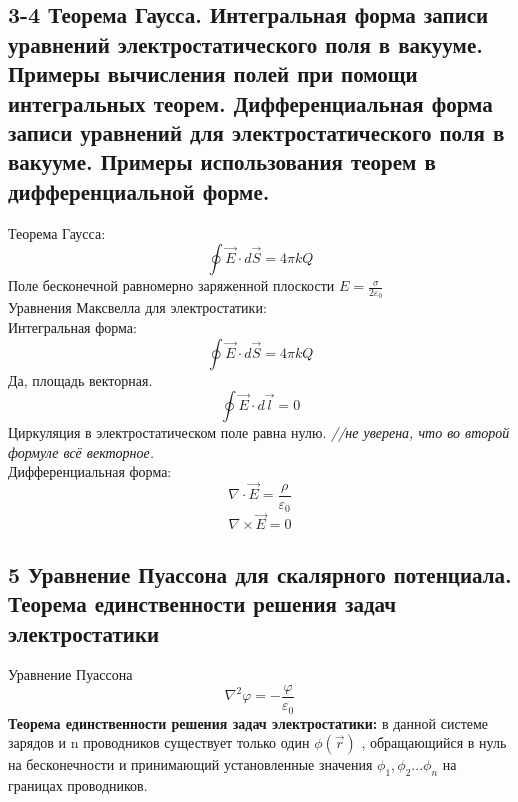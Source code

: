 \documentclass[a4paper,12pt]{article}
\begin{document}
\subsection{3-4  Теорема Гаусса. Интегральная форма записи уравнений электростатического поля в вакууме. Примеры вычисления полей при помощи интегральных теорем. Дифференциальная форма записи уравнений для электростатического поля в вакууме. Примеры использования теорем в дифференциальной форме.}
Теорема Гаусса:\\
\begin{equation}
	\oint \vec{E} \cdot d\vec{S} = 4 \pi k Q
\end{equation}
Поле бесконечной равномерно заряженной плоскости $E = \frac{\sigma}{2 \varepsilon _0}$\\
Уравнения Максвелла для электростатики:\\
Интегральная форма:\\
\begin{equation}
	\oint \vec{E} \cdot d\vec{S} = 4 \pi k Q
\end{equation}
Да, площадь векторная.\\
\begin{equation}
	\oint \vec{E} \cdot d\vec{l} = 0
\end{equation}
Циркуляция в электростатическом поле равна нулю. \textit{//не уверена, что во второй формуле всё векторное.}\\
Дифференциальная форма:\\
\begin{equation}
	\nabla \cdot \vec{E} = \frac{\rho}{\varepsilon _0}
\end{equation}
\begin{equation}
	\nabla \times \vec{E} = 0
\end{equation}


\subsection{5   Уравнение Пуассона для скалярного потенциала. Теорема единственности решения  задач электростатики}
Уравнение Пуассона\\
\begin{equation}
	\nabla ^2 \varphi = - \frac{\varphi}{\varepsilon _0}
\end{equation}
\textbf{Теорема единственности решения задач электростатики:} в данной системе зарядов и n проводников существует только один
$ \phi(\vec{r}) $
, обращающийся в нуль на бесконечности и принимающий установленные значения 
$ \phi_1, \phi_2... \phi_n $
на границах проводников.
\end{document}
